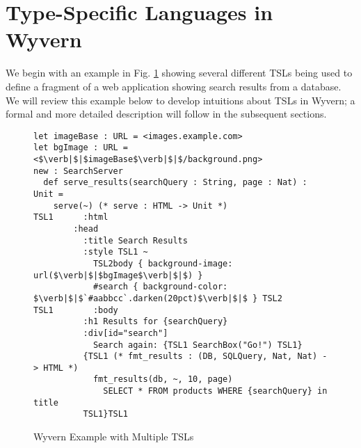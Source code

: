
\section{Type-Specific Languages in Wyvern}
\label{s:motivation}
We begin with an example in Fig. \ref{f-example} showing several different TSLs being used to define a fragment of a web application showing search results from a database. We will review this example below to develop intuitions about TSLs in Wyvern; a formal and more detailed description will follow in the subsequent sections.
\begin{figure}[t]
\begin{lstlisting}
let imageBase : URL = <images.example.com>
let bgImage : URL = <$\verb|$|$imageBase$\verb|$|$/background.png>
new : SearchServer
  def serve_results(searchQuery : String, page : Nat) : Unit =
    serve(~) (* serve : HTML -> Unit *)
TSL1      :html
        :head
          :title Search Results
          :style TSL1 ~
            TSL2body { background-image: url($\verb|$|$bgImage$\verb|$|$) }
            #search { background-color: $\verb|$|$`#aabbcc`.darken(20pct)$\verb|$|$ } TSL2
TSL1        :body
          :h1 Results for {searchQuery}
          :div[id="search"]
            Search again: {TSL1 SearchBox("Go!") TSL1}
          {TSL1 (* fmt_results : (DB, SQLQuery, Nat, Nat) -> HTML *)
            fmt_results(db, ~, 10, page)
              SELECT * FROM products WHERE {searchQuery} in title
          TSL1}TSL1
\end{lstlisting}
\vspace{-8px}
\caption{Wyvern Example with Multiple TSLs}
\label{f-example}
\vspace{-10px}
\end{figure}
